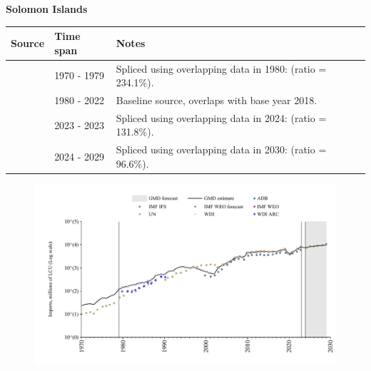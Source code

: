 \documentclass[12pt,a4paper,landscape]{article}
\begin{document}
\begin{adjustbox}{max totalsize={\paperwidth}{\paperheight},center}
\begin{minipage}[t][\textheight][t]{\textwidth}
\vspace*{0.5cm}
{}
\begin{center}
{\Large\bfseries Solomon Islands}
\end{center}
\vspace{0.5cm}
\begin{table}[H]
\centering
\small
\begin{tabular}{|l|l|l|}
\hline
\textbf{Source} & \textbf{Time span} & \textbf{Notes} \\
\hline
\rowcolor{white}\cite{UN}& 1970 - 1979 &Spliced using overlapping data in 1980: (ratio = 234.1\%).\\
\rowcolor{lightgray}\cite{WDI}& 1980 - 2022 &Baseline source, overlaps with base year 2018.\\
\rowcolor{white}\cite{ADB}& 2023 - 2023 &Spliced using overlapping data in 2024: (ratio = 131.8\%).\\
\rowcolor{lightgray}\cite{IMF_WEO_forecast}& 2024 - 2029 &Spliced using overlapping data in 2030: (ratio = 96.6\%).\\
\hline
\end{tabular}
\end{table}
\begin{figure}[H]
\centering
\includegraphics[width=\textwidth,height=0.6\textheight,keepaspectratio]{graphs/SLB_imports.pdf}
\end{figure}
\end{minipage}
\end{adjustbox}
\end{document}
